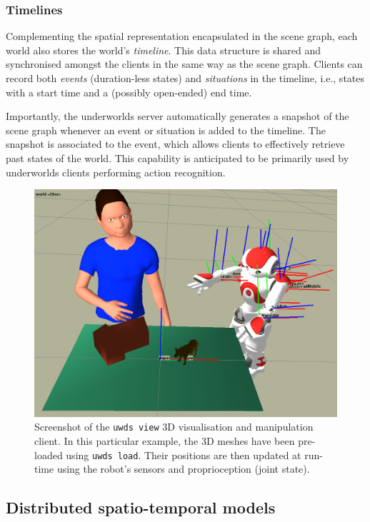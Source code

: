 \documentclass[conference]{IEEEtran}
\newcommand{\ie}{i.e.,\xspace}
\newcommand{\uwds}{{\sc underworlds}\xspace}
\begin{document}
\subsubsection{Timelines}

Complementing the spatial representation encapsulated in the scene graph, each
world also stores the world's \emph{timeline}. This data structure is shared
and synchronised amongst the clients in the same way as the scene graph.
Clients can record both \emph{events} (duration-less states) and
\emph{situations} in the timeline, \ie states with a start time and a (possibly open-ended) end time.

Importantly, the \uwds server automatically generates a snapshot of
the scene graph whenever an event or situation is added to the timeline. The
snapshot is associated to the event, which allows clients to effectively retrieve past
states of the world. This capability is anticipated to be primarily used by \uwds clients
performing action recognition.

\begin{figure}
    \centering
    \includegraphics[width=\linewidth]{uwds-screenshot}
    \caption{Screenshot of the {\tt uwds view} 3D visualisation and manipulation
    client. In this particular example, the 3D meshes have been pre-loaded using
    {\tt uwds load}. Their positions are then updated at run-time using the
    robot's sensors and proprioception (joint state).}
    \label{fig|uwds-view}
\end{figure}

\subsection{Distributed spatio-temporal models}
\label{arch}
\end{document}

